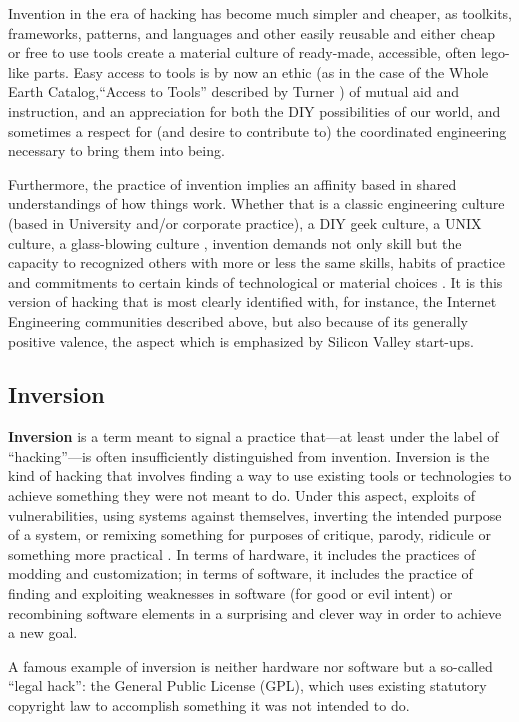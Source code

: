 \documentclass[10pt,letter,oneside]{scrartcl}
\begin{document}
Invention in the era of hacking has become much simpler and cheaper, as
toolkits, frameworks, patterns, and languages and other easily reusable and
either cheap or free to use tools create a material culture of ready-made,
accessible, often lego-like parts.  Easy access to tools is by now an ethic (as
in the case of the Whole Earth Catalog,``Access to Tools'' described by Turner
\cite*{turner_counterculture_2006}) of mutual aid and instruction, and an
appreciation for both the DIY possibilities of our world, and sometimes a
respect for (and desire to contribute to) the coordinated engineering necessary
to bring them into being.

Furthermore, the practice of invention implies an affinity based in shared
understandings of how things work.  Whether that is a classic engineering
culture (based in University and/or corporate practice), a DIY geek culture, a
UNIX culture, a glass-blowing culture \parencite{o2005embodied}, invention
demands not only skill but the capacity to recognized others with more or less
the same skills, habits of practice and commitments to certain kinds of
technological or material choices \parencite{Sennett2008}.  It is this version
of hacking that is most clearly identified with, for instance, the Internet
Engineering communities described above, but also because of its generally
positive valence, the aspect which is emphasized by Silicon Valley start-ups.

\subsection*{Inversion}

\textbf{Inversion} is a term meant to signal a practice that---at least under
the label of ``hacking''---is often insufficiently distinguished from invention.
Inversion is the kind of hacking that involves finding a way to use existing
tools or technologies to achieve something they were not meant to do.  Under
this aspect, exploits of vulnerabilities, using systems against themselves,
inverting the intended purpose of a system, or remixing something for purposes
of critique, parody, ridicule or something more practical
\cite{galloway2007exploit}.  In terms of hardware, it includes the practices of
modding and customization; in terms of software, it includes the practice of
finding and exploiting weaknesses in software (for good or evil intent) or
recombining software elements in a surprising and clever way in order to achieve
a new goal.

A famous example of inversion is neither hardware nor software but a so-called
``legal hack'': the General Public License (GPL), which uses existing statutory
copyright law to accomplish something it was not intended to do.
\end{document}
